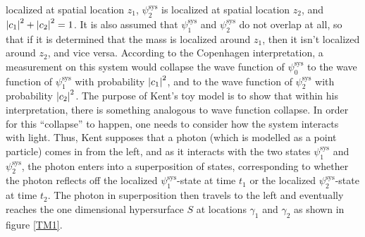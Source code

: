  localized at spatial location $z_1$, $\psi_2^\text{sys}$ is localized at spatial location $z_2$, and $\abs{c_1}^2+\abs{c_2}^2=1$. It is also assumed that $\psi_1^\text{sys}$ and $\psi_2^\text{sys}$ do not overlap at all, so that if it is determined that the mass is localized around $z_1$, then it isn't localized around $z_2$, and vice versa. According to the Copenhagen interpretation, a measurement on this system would collapse the wave function of $\psi_0^\text{sys}$ to the wave function of $\psi_1^\text{sys}$ with probability $\abs{c_1}^2$, and to the wave function of $\psi_2^\text{sys}$ with probability $\abs{c_2}^2$. The purpose of Kent's toy model is to show that within his interpretation, there is something analogous to wave function collapse.  In order for this ``collapse'' to happen, one needs to consider how the system interacts with light. Thus, Kent supposes that a photon (which is modelled as a point particle) comes in from the left, and as it interacts with the two states $\psi_1^\text{sys}$ and $\psi_2^\text{sys}$, the photon enters into a superposition of states, corresponding to whether the photon reflects off the localized $\psi_1^\text{sys}$-state at time $t_1$ or the localized $\psi_2^\text{sys}$-state at time $t_2$. The photon in superposition then travels to the left and eventually reaches the one dimensional hypersurface $S$ at locations $\gamma_1$ and $\gamma_2$ as shown in figure  \ref{TM1}.


